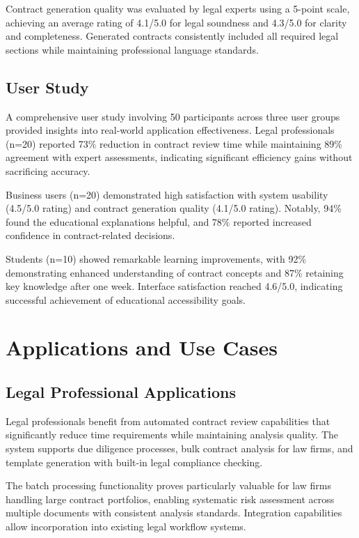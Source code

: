 \documentclass[conference]{IEEEtran}
\begin{document}
Contract generation quality was evaluated by legal experts using a 5-point scale, achieving an average rating of 4.1/5.0 for legal soundness and 4.3/5.0 for clarity and completeness. Generated contracts consistently included all required legal sections while maintaining professional language standards.

\subsection{User Study}

A comprehensive user study involving 50 participants across three user groups provided insights into real-world application effectiveness. Legal professionals (n=20) reported 73\% reduction in contract review time while maintaining 89\% agreement with expert assessments, indicating significant efficiency gains without sacrificing accuracy.

Business users (n=20) demonstrated high satisfaction with system usability (4.5/5.0 rating) and contract generation quality (4.1/5.0 rating). Notably, 94\% found the educational explanations helpful, and 78\% reported increased confidence in contract-related decisions.

Students (n=10) showed remarkable learning improvements, with 92\% demonstrating enhanced understanding of contract concepts and 87\% retaining key knowledge after one week. Interface satisfaction reached 4.6/5.0, indicating successful achievement of educational accessibility goals.

\section{Applications and Use Cases}

\subsection{Legal Professional Applications}

Legal professionals benefit from automated contract review capabilities that significantly reduce time requirements while maintaining analysis quality. The system supports due diligence processes, bulk contract analysis for law firms, and template generation with built-in legal compliance checking.

The batch processing functionality proves particularly valuable for law firms handling large contract portfolios, enabling systematic risk assessment across multiple documents with consistent analysis standards. Integration capabilities allow incorporation into existing legal workflow systems.
\end{document}
